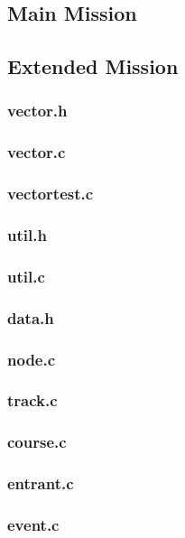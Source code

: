 \documentclass[a4paper, twoside]{article}
\begin{document}
\subsection{Main Mission}

\newpage
\subsection{Extended Mission}
\subsubsection{vector.h}

\subsubsection{vector.c}

\subsubsection{vectortest.c}

\subsubsection{util.h}

\subsubsection{util.c}

\subsubsection{data.h}

\subsubsection{node.c}

\subsubsection{track.c}

\subsubsection{course.c}

\subsubsection{entrant.c}

\subsubsection{event.c}

\end{document}
